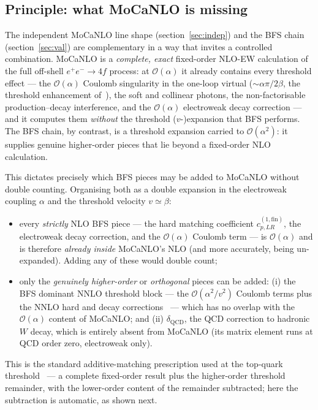 \documentclass[11pt,a4paper]{article}
\begin{document}
\subsection{Principle: what MoCaNLO is missing}\label{sec:match-principle}

The independent MoCaNLO line shape (section~\ref{sec:indep}) and the BFS chain
(section~\ref{sec:val}) are complementary in a way that invites a controlled
combination. MoCaNLO is a \emph{complete, exact} fixed-order NLO-EW calculation of
the full off-shell $e^+e^-\!\to 4f$ process: at $\mathcal O(\alpha)$ it already
contains every threshold effect --- the $\mathcal O(\alpha)$ Coulomb singularity in
the one-loop virtual ($\sim\!\alpha\pi/2\beta$, the
threshold enhancement of~\cite{FKM1993,FKM1995}), the soft and collinear photons,
the non-factorisable production--decay interference, and the $\mathcal O(\alpha)$
electroweak decay correction --- and it computes them \emph{without} the threshold
($v$-)expansion that BFS performs. The BFS chain, by contrast, is a threshold
expansion carried to $\mathcal O(\alpha^2)$: it supplies genuine higher-order pieces
that lie beyond a fixed-order NLO calculation.

This dictates precisely which BFS pieces may be added to MoCaNLO without double
counting. Organising both as a double expansion in the electroweak coupling
$\alpha$ and the threshold velocity $v\simeq\beta$:
\begin{itemize}
  \item every \emph{strictly} NLO BFS piece --- the hard matching coefficient
    $c_{p,LR}^{(1,\mathrm{fin})}$, the electroweak decay correction, and the
    $\mathcal O(\alpha)$ Coulomb term --- is $\mathcal O(\alpha)$ and is therefore
    \emph{already inside} MoCaNLO's NLO (and more accurately, being un-expanded).
    Adding any of these would double count;
  \item only the \emph{genuinely higher-order} or \emph{orthogonal} pieces can be
    added: (i) the BFS dominant NNLO threshold block --- the
    $\mathcal O(\alpha^2/v^2)$ Coulomb terms plus the NNLO hard and decay
    corrections~\cite{BFSnnlo} --- which has no overlap with the
    $\mathcal O(\alpha)$ content of MoCaNLO; and (ii) $\delta_\text{QCD}$, the QCD
    correction to hadronic $W$ decay, which is entirely absent from MoCaNLO (its
    matrix element runs at QCD order zero, electroweak only).
\end{itemize}
This is the standard additive-matching prescription used at the top-quark
threshold~\cite{Beneke2015,HoangStahlhofen} --- a complete fixed-order result plus
the higher-order threshold remainder, with the lower-order content of the remainder
subtracted; here the subtraction is automatic, as shown next.
\end{document}

